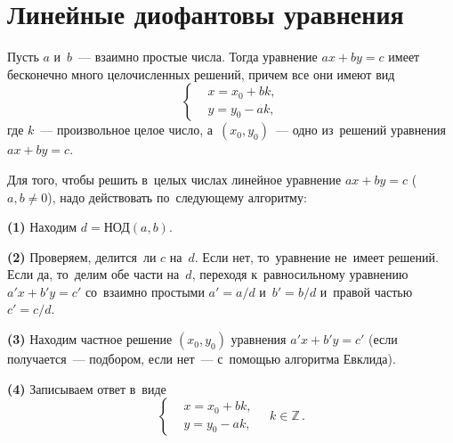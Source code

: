 
\section*{Линейные диофантовы уравнения}


\theorem
Пусть $a$ и~$b$~--- взаимно простые числа.
Тогда уравнение $a x + b y = c$ имеет бесконечно много целочисленных решений,
причем все они имеют вид
\[
    \left\{\begin{aligned} &
        x = x_0 + b k
    , \\ &
        y = y_0 - a k
    , \end{aligned}\right.
\]
где $k$~--- произвольное целое число, а~$(x_0, y_0)$~--- одно из~решений
уравнения $a x + b y = c$. 

Для того, чтобы решить в~целых числах линейное уравнение
$a x + b y = c$ ($a, b \neq 0$), надо действовать по~следующему алгоритму:
\par
\textbf{(1)} Находим $d = \text{НОД}(a, b)$.
\par
\textbf{(2)}
Проверяем, делится~ли $c$ на~$d$.
Если нет, то~уравнение не~имеет решений.
Если да, то~делим обе части на~$d$, переходя к~равносильному уравнению
$a' x + b' y = c'$ со~взаимно простыми $a' = a / d$ и~$b' = b / d$
и~правой частью $c' = c / d$.
\par
\textbf{(3)}
Находим частное решение $(x_0, y_0)$ уравнения $a' x + b' y = c'$
(если получается~--- подбором, если нет~--- с~помощью алгоритма Евклида).
\par
\textbf{(4)}
Записываем ответ в~виде
\[
    \left\{\begin{aligned} &
        x = x_0 + b k
    , \\ &
        y = y_0 - a k
    , \end{aligned}\right.
\quad
    k \in \mathbb{Z}
\,.\]

